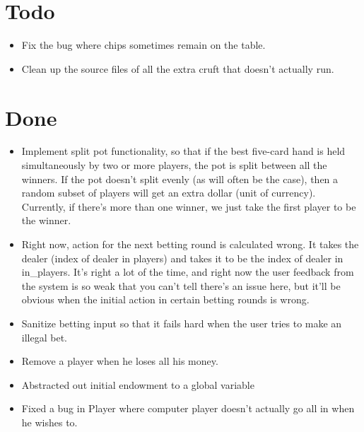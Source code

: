 \documentclass{article}
\begin{document}
\section*{Todo}
\begin{itemize}
\item Fix the bug where chips sometimes remain on the table.
\item Clean up the source files of all the extra cruft that doesn't actually run.
\end{itemize}

\section*{Done}
\begin{itemize}
\item \CheckedBox Implement split pot functionality, so that if the best five-card
  hand is held simultaneously by two or more players, the pot is split
  between all the winners. If the pot doesn't split evenly (as will
  often be the case), then a random subset of players will get an
  extra dollar (unit of currency). Currently, if there's more than one
  winner, we just take the first player to be the winner.
\item \CheckedBox Right now, action for the next betting round is calculated
  wrong. It takes the dealer (index of dealer in players) and takes it
  to be the index of dealer in in\_players. It's right a lot of the
  time, and right now the user feedback from the system is so weak
  that you can't tell there's an issue here, but it'll be obvious when
  the initial action in certain betting rounds is wrong.
\item \CheckedBox Sanitize betting input so that it fails hard when the user tries
  to make an illegal bet.
\item \CheckedBox Remove a player when he loses all his money.
\item \CheckedBox Abstracted out initial endowment to a global variable
\item \CheckedBox Fixed a bug in Player where computer player doesn't
  actually go all in when he wishes to.
\end{itemize}
\end{document}
